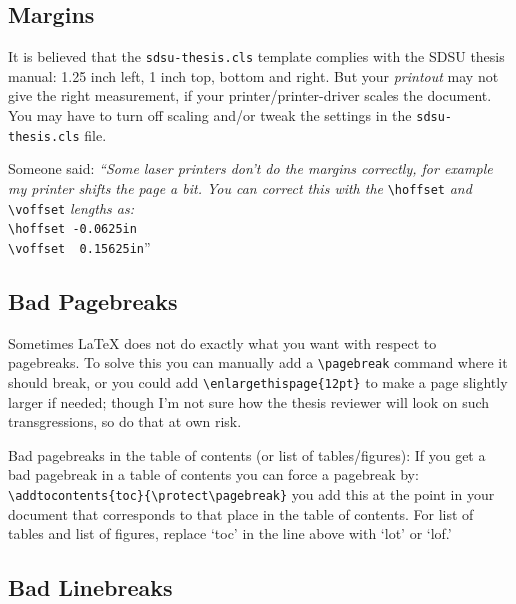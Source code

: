 \subsection{Margins}

It is believed that the \verb+sdsu-thesis.cls+ template complies with
the SDSU thesis manual: 1.25 inch left, 1 inch top, bottom and right.
But your \emph{printout} may not give the right measurement, if your
printer/printer-driver scales the document.  You may have to turn off
scaling and/or tweak the settings in the \verb+sdsu-thesis.cls+ file.

Someone said: \emph{``Some laser printers don't do the margins correctly, for
example my printer shifts the page a bit.  You can correct this with
the} \verb+\hoffset+ \emph{and} \verb+\voffset+ \emph{lengths as:}\\
\hspace*{2em}\verb+\hoffset -0.0625in+\\
\hspace*{2em}\verb+\voffset  0.15625in+''


\subsection{Bad Pagebreaks}

Sometimes LaTeX does not do exactly what you want with respect to
pagebreaks.  To solve this you can manually add a \verb+\pagebreak+
command where it should break, or you could add
\verb+\enlargethispage{12pt}+ to make a page slightly larger if
needed; though I'm not sure how the thesis reviewer will look on such
transgressions, so do that at own risk.

Bad pagebreaks in the table of contents (or list of tables/figures):
If you get a bad pagebreak in a table of contents you can force a
pagebreak by: \verb+\addtocontents{toc}{\protect\pagebreak}+ you add
this at the point in your document that corresponds to that place in
the table of contents.  For list of tables and list of figures,
replace `toc' in the line above with `lot' or `lof.'


\subsection{Bad Linebreaks}

